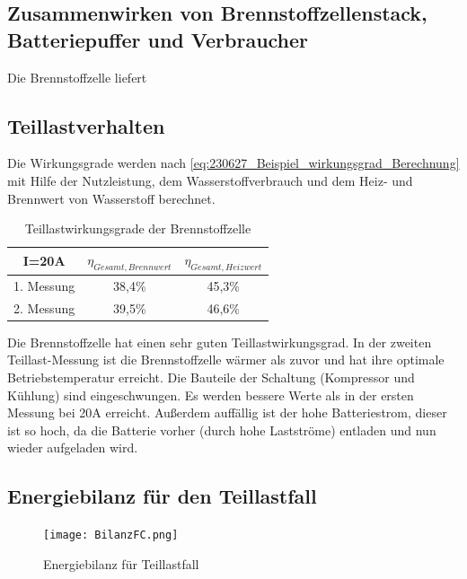 \subsection{Zusammenwirken von Brennstoffzellenstack, Batteriepuffer und Verbraucher}
Die Brennstoffzelle liefert 



\subsection{Teillastverhalten}

Die Wirkungsgrade werden nach \autoref{eq:230627_Beispiel_wirkungsgrad_Berechnung} mit Hilfe der Nutzleistung, dem Wasserstoffverbrauch und dem Heiz- und Brennwert von Wasserstoff berechnet. 

\begin{table}[H]
    \caption{Teillastwirkungsgrade der Brennstoffzelle}
    \centering
        \begin{tabular}[pos]{|c|c|c|}
            \hline
            \rowcolor[HTML]{70AD47} 
            I=20A   & $\eta_{Gesamt,Brennwert}$               & $\eta_{Gesamt,Heizwert}$   \\\hline\hline
            1. Messung  & 38,4\%                            & 45,3\%                            \\ \hline
            2. Messung  & 39,5\%                            & 46,6\%                            \\\hline
        \end{tabular}
        \label{tab:20230628_Teillastwirkungsgrade}
\end{table}

Die Brennstoffzelle hat einen sehr guten Teillastwirkungsgrad. In der zweiten Teillast-Messung ist die Brennstoffzelle wärmer als zuvor und hat ihre optimale Betriebstemperatur erreicht. Die Bauteile der Schaltung (Kompressor und Kühlung) sind eingeschwungen. Es werden bessere Werte als in der ersten Messung bei 20A erreicht. Außerdem auffällig ist der hohe Batteriestrom, dieser ist so hoch, da die Batterie vorher (durch hohe Lastströme) entladen und nun wieder aufgeladen wird. 

\newpage
\subsection{Energiebilanz für den Teillastfall}

\begin{figure}[H]
  \texttt{[image: BilanzFC.png]}
\caption{Energiebilanz für Teillastfall}
\label{fig:20230630_Energiebilanz}
\end{figure}

